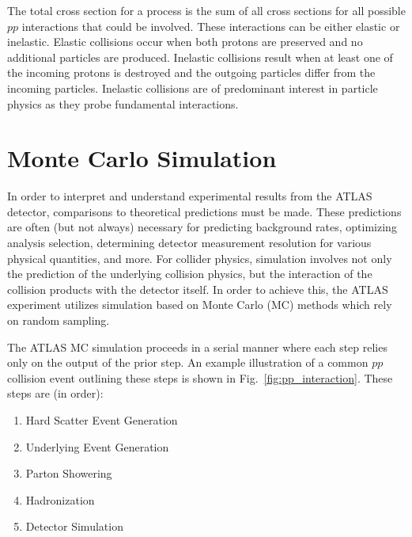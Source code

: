 The total cross section for a process is the sum of all cross sections for all possible $pp$ interactions that could be involved.
These interactions can be either elastic or inelastic.
Elastic collisions occur when both protons are preserved and no additional particles are produced.
Inelastic collisions result when at least one of the incoming protons is destroyed and the outgoing particles differ from the incoming particles.
Inelastic collisions are of predominant interest in particle physics as they probe fundamental interactions.

\section{Monte Carlo Simulation}
\label{sec:monte_carlo}
In order to interpret and understand experimental results from the ATLAS detector, comparisons to theoretical predictions must be made.
These predictions are often (but not always) necessary for predicting background rates, optimizing analysis selection, determining detector measurement resolution for various physical quantities, and more.
For collider physics, simulation involves not only the prediction of the underlying collision physics, but the interaction of the collision products with the detector itself.
In order to achieve this, the ATLAS experiment utilizes simulation based on Monte Carlo (MC) methods which rely on random sampling.

The ATLAS MC simulation proceeds in a serial manner where each step relies only on the output of the prior step.
An example illustration of a common $pp$ collision event outlining these steps is shown in Fig.~\ref{fig:pp_interaction}.
These steps are (in order):
\begin{enumerate}
    \itemsep0em 
    \item Hard Scatter Event Generation
    \item Underlying Event Generation
    \item Parton Showering
    \item Hadronization
    \item Detector Simulation
\end{enumerate}


